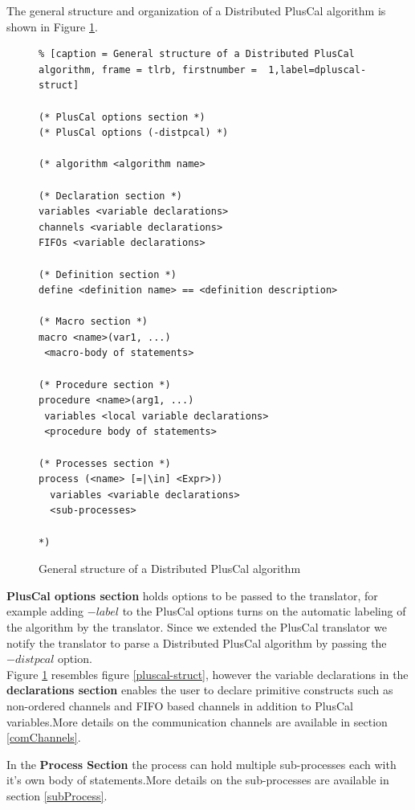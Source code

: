 \documentclass{thesul}
\begin{document}
The general structure and organization of a Distributed PlusCal algorithm is shown in Figure \ref{dpluscal-struct}.


\begin{figure}
\begin{lstlisting}% [caption = General structure of a Distributed PlusCal algorithm, frame = tlrb, firstnumber =  1,label=dpluscal-struct]

(* PlusCal options section *)
(* PlusCal options (-distpcal) *)

(* algorithm <algorithm name>

(* Declaration section *)
variables <variable declarations>
channels <variable declarations>
FIFOs <variable declarations>

(* Definition section *)
define <definition name> == <definition description>

(* Macro section *)
macro <name>(var1, ...)
 <macro-body of statements>

(* Procedure section *)
procedure <name>(arg1, ...)
 variables <local variable declarations>
 <procedure body of statements>

(* Processes section *)
process (<name> [=|\in] <Expr>))
  variables <variable declarations>
  <sub-processes>

*)

\end{lstlisting}
\caption{General structure of a Distributed PlusCal algorithm}
\label{dpluscal-struct}
\end{figure}

\textbf{PlusCal options section} holds options to be passed to the translator, for example adding $-label$ to the PlusCal options turns on the automatic labeling of the algorithm by the translator. Since we extended the PlusCal translator we notify the translator to parse a Distributed PlusCal algorithm by passing the $-distpcal$ option.\\

Figure \ref{dpluscal-struct} resembles figure \ref{pluscal-struct}, however the variable declarations in the \textbf{declarations section} enables the user to declare primitive constructs such as non-ordered channels and FIFO based channels in addition to PlusCal variables.More details on the communication channels are available in section \ref{comChannels}.

In the \textbf{Process Section} the process can hold multiple sub-processes each with it's own body of statements.More details on the sub-processes are available in section \ref{subProcess}.
\end{document}
